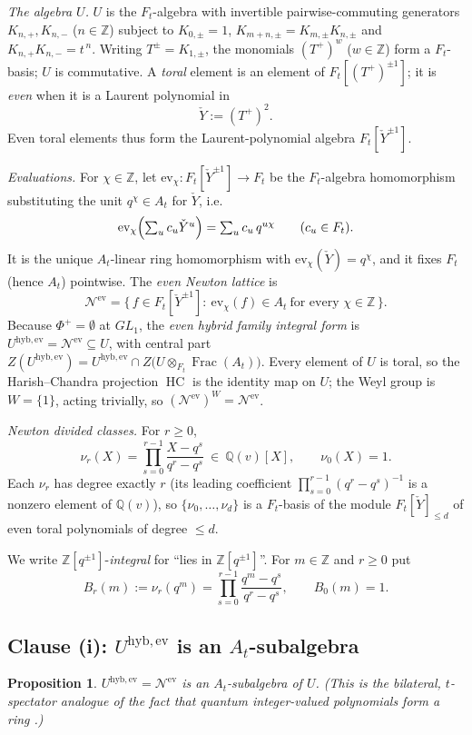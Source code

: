 \documentclass[11pt]{article}
\newtheorem{proposition}{Proposition}
\newcommand{\At}{A_t}
\newcommand{\Ft}{F_t}
\newcommand{\Nev}{\mathcal N^{\mathrm{ev}}}
\newcommand{\Uev}{U^{\mathrm{hyb,ev}}}
\newcommand{\HC}{\operatorname{HC}}
\newcommand{\Yc}{\check Y}
\newcommand{\Z}{\mathbb Z}
\newcommand{\ev}{\mathrm{ev}}
\begin{document}
\emph{The algebra $U$.}\;
$U$ is the $\Ft$-algebra with invertible pairwise-commuting generators
$K_{n,+},K_{n,-}$ ($n\in\Z$) subject to
$K_{0,\pm}=1$, $K_{m+n,\pm}=K_{m,\pm}K_{n,\pm}$ and $K_{n,+}K_{n,-}=t^{\,n}$.
Writing $T^{\pm}=K_{1,\pm}$, the monomials $(T^{+})^{w}$ ($w\in\Z$) form a
$\Ft$-basis; $U$ is commutative. A \emph{toral} element is an element of
$\Ft[(T^{+})^{\pm1}]$; it is \emph{even} when it is a Laurent polynomial in
\[
  \Yc:=(T^{+})^{2}.
\]
Even toral elements thus form the Laurent-polynomial algebra
$\Ft[\Yc^{\pm1}]$.

\emph{Evaluations.}\;
For $\chi\in\Z$, let $\ev_\chi\colon\Ft[\Yc^{\pm1}]\to\Ft$ be the
$\Ft$-algebra homomorphism substituting the unit $q^{\chi}\in\At$ for $\Yc$,
i.e.
\[
  \ev_\chi\Bigl(\textstyle\sum_{u}c_u\Yc^{u}\Bigr)=\sum_u c_u\,q^{u\chi}
  \qquad(c_u\in\Ft).
\]
It is the unique $\At$-linear ring homomorphism with $\ev_\chi(\Yc)=q^{\chi}$,
and it fixes $\Ft$ (hence $\At$) pointwise. The \emph{even Newton lattice} is
\[
  \Nev=\bigl\{\,f\in\Ft[\Yc^{\pm1}]:\ \ev_\chi(f)\in\At\ \text{for every }
  \chi\in\Z\,\bigr\}.
\]
Because $\Phi^{+}=\emptyset$ at $GL_1$, the \emph{even hybrid family integral
form} is $\Uev=\Nev\subseteq U$, with central part
$Z(\Uev)=\Uev\cap Z\bigl(U\otimes_{\Ft}\operatorname{Frac}(\At)\bigr)$. Every
element of $U$ is toral, so the Harish--Chandra projection $\HC$ is the identity
map on $U$; the Weyl group is $W=\{1\}$, acting trivially, so
$(\Nev)^{W}=\Nev$.

\emph{Newton divided classes.}\;
For $r\ge0$,
\[
  \nu_{r}(X)=\prod_{s=0}^{r-1}\frac{X-q^{s}}{q^{r}-q^{s}}\ \in\ \mathbb Q(v)[X],
  \qquad \nu_0(X)=1 .
\]
Each $\nu_r$ has degree exactly $r$ (its leading coefficient
$\prod_{s=0}^{r-1}(q^{r}-q^{s})^{-1}$ is a nonzero element of $\mathbb Q(v)$),
so $\{\nu_0,\dots,\nu_d\}$ is a $\Ft$-basis of the module
$\Ft[\Yc]_{\le d}$ of even toral polynomials of degree $\le d$.

\medskip
We write $\Z[q^{\pm1}]$-\emph{integral} for ``lies in $\Z[q^{\pm1}]$''.
For $m\in\Z$ and $r\ge0$ put
\[
  B_r(m):=\nu_r(q^{m})=\prod_{s=0}^{r-1}\frac{q^{m}-q^{s}}{q^{r}-q^{s}},
  \qquad B_0(m)=1 .
\]

\subsection{Clause (i): $\Uev$ is an $\At$-subalgebra}

\begin{proposition}
$\Uev=\Nev$ is an $\At$-subalgebra of $U$. (This is the bilateral,
$t$-spectator analogue of the fact that quantum integer-valued polynomials
form a ring \cite[\S1]{HarmanHopkins}.)
\end{proposition}
\end{document}
